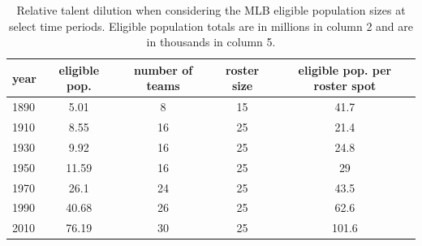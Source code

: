 \documentclass[11pt]{article}\usepackage[]{graphicx}\usepackage[]{color}
\begin{document}
\begin{table}[h!]
\begin{center}
\begin{tabular}{lcccc}
\hline
year & eligible pop. & number of teams & roster size & eligible pop. per roster spot \\
\hline
1890 & 5.01  & 8  & 15 & 41.7   \\
1910 & 8.55  & 16 & 25 & 21.4  \\
1930 & 9.92  & 16 & 25 & 24.8  \\
1950 & 11.59  & 16 & 25 & 29  \\
1970 & 26.1  & 24 & 25 & 43.5  \\
1990 & 40.68 & 26 & 25 & 62.6 \\
2010 & 76.19 & 30 & 25 & 101.6 \\
\hline
\end{tabular}
\end{center}
\caption{Relative talent dilution when considering the MLB eligible population 
  sizes at select time periods. Eligible population totals are in millions in 
  column 2 and are in thousands in column 5. }
\label{dilution}
\end{table}
\end{document}
